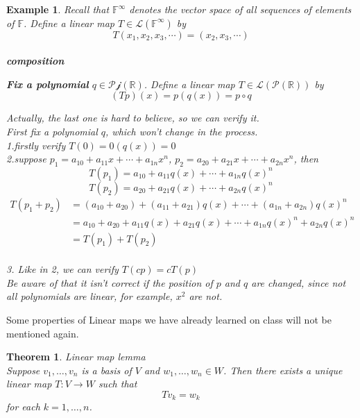 \documentclass{article}
\newtheorem{theorem}{Theorem}[subsection]
\newtheorem{example}{Example}[subsection]
\newcommand{\RR}{\mathbb{R}}
\newcommand{\FF}{\mathbb{F}}
\begin{document}
\begin{CJK}{UTF8}{gkai}
\begin{example}
Recall that $\FF^\infty$ denotes the vector space of all sequences of elements of $\FF$. Define a linear map $T \in \mathcal{L}(\FF^\infty)$ by
\[T(x_1,x_2,x_3,\cdots) = (x_2,x_3,\cdots)\]\\

\textbf{composition\\}

\textbf{Fix a polynomial} $q \in \mathcal{Pj}(\RR)$. Define a linear map $T \in \mathcal{L}(\mathcal{P}(\RR))$ by
\[(Tp)(x) = p(q(x)) = p \circ q\]

Actually, the last one is hard to believe, so we can verify it.\\

First fix a polynomial $q$, which won't change in the process.\\

1.firstly verify $T(0) = 0(q(x)) = 0$\\

2.suppose $p_1 = a_{10} + a_{11} x + \cdots + a_{1n} x^n$, $p_2 = a_{20} + a_{21} x + \cdots + a_{2n} x^n$, then
\[T(p_1) = a_{10} + a_{11} q(x) + \cdots + a_{1n} q(x)^n \]
\[T(p_2) = a_{20} + a_{21} q(x) + \cdots + a_{2n} q(x)^n\]
\[
\begin{aligned}
    T(p_1 + p_2) &= (a_{10} + a_{20}) + (a_{11}+a_{21}) q(x) + \cdots + (a_{1n} + a_{2n}) q(x)^n \\
    &=a_{10} + a_{20} + a_{11} q(x) + a_{21} q(x) + \cdots + a_{1n} q(x)^n + a_{2n} q(x)^n\\
    &= T(p_1) + T(p_2)
\end{aligned}    
\]\\

3. Like in 2, we can verify $T(cp) = cT(p)$\\

Be aware of that it isn't correct if the position of $p$ and $q$ are changed, since not all polynomials are linear, for example, $x^2$ are not.

\end{example}

Some properties of Linear maps we have already learned on class will not be mentioned again.\\

\begin{theorem}
    Linear map lemma\\

 Suppose $v_1,\ldots,v_n$ is a basis of $V$ and $w_1,\ldots,w_n \in W$. Then there exists a
 unique linear map $T: V \to W$ such that
 \[Tv_k = w_k\]
 for each $k = 1,\ldots,n$.
\end{theorem}


\end{CJK}
\end{document}
